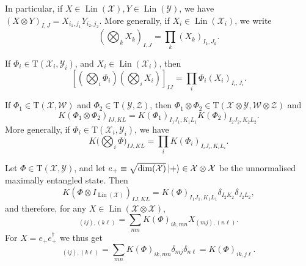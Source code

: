 \documentclass[12pt]{report}
\newcommand{\calY}{{\mathcal{Y}}}
\newcommand{\calW}{{\mathcal{W}}}
\newcommand{\calX}{{\mathcal{X}}}
\newcommand{\calZ}{{\mathcal{Z}}}
\newcommand{\rmT}{{\mathrm{T}}}
\DeclareMathOperator{\Lin}{Lin}
\begin{document}
In particular, if $X\in\Lin(\calX), Y\in\Lin(\calY)$, we have
	$(X\otimes Y)_{I,J} = X_{i_1,j_1} Y_{i_2,j_2}.$
More generally, if $X_i\in\Lin(\calX_i)$, we write
\begin{equation}
	\left(\bigotimes_k X_k\right)_{I,J}
	= \prod_k (X_k)_{I_k,J_k}.
\end{equation}

If $\Phi_i\in\rmT(\calX_i,\calY_i)$, and $X_i\in\Lin(\calX_i)$, then
\begin{equation}
	\left[
	\left(\bigotimes_i \Phi_i\right)\left(\bigotimes_i X_i\right)
	\right]_{IJ}
	= \prod_i \Phi_i(X_i)_{I_i,J_i}.
\end{equation}

If $\Phi_1\in\rmT(\calX,\calW)$ and $\Phi_2\in\rmT(\calY,\calZ)$,
then $\Phi_1\otimes\Phi_2\in\rmT(\calX\otimes\calY,\calW\otimes\calZ)$ and
\begin{equation}
	K(\Phi_1\otimes \Phi_2)_{IJ,KL}
	= K(\Phi_1)_{I_1 J_1, K_1 L_1}
	K(\Phi_2)_{I_2 J_2, K_2 L_2}.
\end{equation}
More generally, if $\Phi_i\in\rmT(\calX_i,\calY_i)$, we have
\begin{equation}
	K\big(\bigotimes_i \Phi\big)_{IJ,KL}
	= \prod_i K(\Phi_i)_{I_i J_i,K_i L_i}.
\end{equation}

\begin{example}
	Let $\Phi\in\rmT(\calX,\calY)$, and let
	$e_+\equiv \sqrt{\dim(\calX)}\ket+\in\calX\otimes\calX$
	be the unnormalised maximally entangled state. Then
	\begin{equation}
		K(\Phi\otimes I_{\Lin(\calX)})_{IJ,KL}
		= K(\Phi)_{I_1 J_1,K_1 L_1}
		\delta_{I_2 K_2} \delta_{J_2 L_2},
	\end{equation}
	and therefore, for any $X\in\Lin(\calX\otimes\calX)$,
	\begin{equation}
		[(\Phi\otimes I_{\Lin(\calX)})(X)]_{(ij),(k\ell)}
		= \sum_{mn} K(\Phi)_{ik,mn} X_{(mj),(n\ell)}.
	\end{equation}
	For $X=e_+ e_+^\dagger$ we thus get
	\begin{equation}
		[(\Phi\otimes I_{\Lin(\calX)})(e_+ e_+^\dagger)]_{(ij),(k\ell)}
		= \sum_{mn}
		K(\Phi)_{ik,mn} \delta_{mj} \delta_{n\ell}
		= K(\Phi)_{ik,j\ell}.
	\end{equation}
\end{example}
\end{document}
